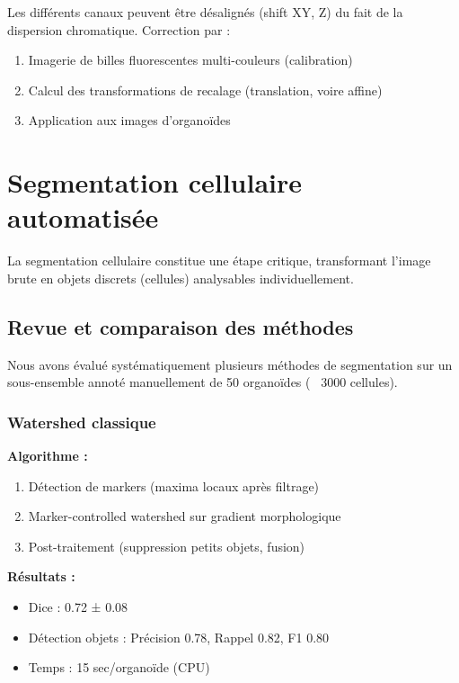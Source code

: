 Les différents canaux peuvent être désalignés (shift XY, Z) du fait de la dispersion chromatique. Correction par :
\begin{enumerate}
    \item Imagerie de billes fluorescentes multi-couleurs (calibration)
    \item Calcul des transformations de recalage (translation, voire affine)
    \item Application aux images d'organoïdes
\end{enumerate}

\section{Segmentation cellulaire automatisée}

La segmentation cellulaire constitue une étape critique, transformant l'image brute en objets discrets (cellules) analysables individuellement.

\subsection{Revue et comparaison des méthodes}

Nous avons évalué systématiquement plusieurs méthodes de segmentation sur un sous-ensemble annoté manuellement de 50 organoïdes (~ 3000 cellules).

\subsubsection{Watershed classique}

\textbf{Algorithme :}
\begin{enumerate}
    \item Détection de markers (maxima locaux après filtrage)
    \item Marker-controlled watershed sur gradient morphologique
    \item Post-traitement (suppression petits objets, fusion)
\end{enumerate}

\textbf{Résultats :}
\begin{itemize}
    \item Dice : 0.72 ± 0.08
    \item Détection objets : Précision 0.78, Rappel 0.82, F1 0.80
    \item Temps : 15 sec/organoïde (CPU)
\end{itemize}

